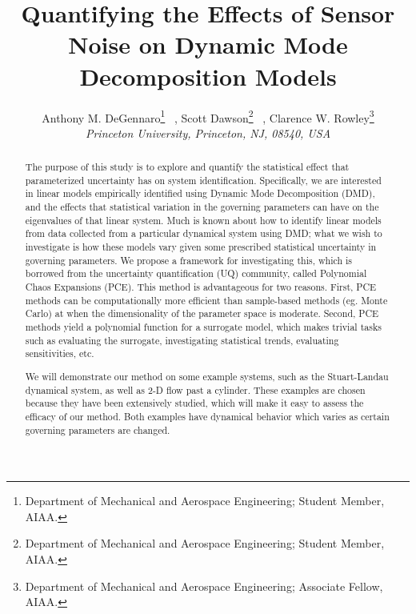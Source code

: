 \documentclass{article}%
\title{Quantifying the Effects of Sensor Noise on Dynamic Mode Decomposition Models}
\author{%
  Anthony M. DeGennaro\thanks{Department of Mechanical and Aerospace
    Engineering; Student Member, AIAA.}
  \ ,
  Scott Dawson\thanks{Department of Mechanical and Aerospace
    Engineering; Student Member, AIAA.}
  \ ,
  Clarence W. Rowley\thanks{Department of Mechanical and Aerospace Engineering;
    Associate Fellow, AIAA.}\\
  {\normalsize\itshape
   Princeton University, Princeton, NJ, 08540, USA}\\
 }
\begin{document}
\maketitle

\begin{abstract}
  The purpose of this study is to explore and quantify the statistical
  effect that parameterized uncertainty has on system
  identification. Specifically, we are interested in linear models
  empirically identified using Dynamic Mode Decomposition (DMD), and
  the effects that statistical variation in the governing parameters
  can have on the eigenvalues of that linear system. Much is known
  about how to identify linear models from data collected from a
  particular dynamical system using DMD; what we wish to investigate
  is how these models vary given some prescribed statistical
  uncertainty in governing parameters. We propose a framework for
  investigating this, which is borrowed from the uncertainty
  quantification (UQ) community, called Polynomial Chaos Expansions
  (PCE). This method is advantageous for two reasons. First, PCE
  methods can be computationally more efficient than sample-based
  methods (eg. Monte Carlo) at when the dimensionality of the
  parameter space is moderate. Second, PCE methods yield a polynomial
  function for a surrogate model, which makes trivial tasks such as
  evaluating the surrogate, investigating statistical trends,
  evaluating sensitivities, etc.

  We will demonstrate our method on some example systems, such as the
  Stuart-Landau dynamical system, as well as 2-D flow past a
  cylinder. These examples are chosen because they have been
  extensively studied, which will make it easy to assess the efficacy
  of our method. Both examples have dynamical behavior which varies as
  certain governing parameters are changed.

\end{abstract}
\end{document}
